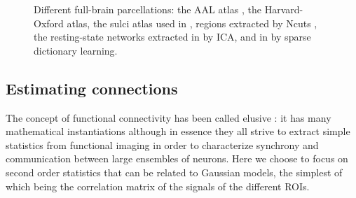 \documentclass[5p]{elsarticle}
\begin{document}
\begin{figure}
\caption{
Different full-brain parcellations: the AAL atlas
\cite{tzourio-mazoyer2002a}, the Harvard-Oxford atlas, the sulci atlas used in
\cite{varoquaux2010c}, regions extracted by Ncuts
\cite{craddock2012}, the resting-state networks extracted in
\cite{smith2009} by ICA, and in \cite{varoquaux2011} by sparse dictionary
learning.
\label{fig:parcellations}
}
\end{figure}

\subsection{Estimating connections}

The concept of functional connectivity has been called elusive
\cite{horwitz2003}: it has many mathematical instantiations although in
essence they all strive to extract simple statistics from functional
imaging in order to characterize synchrony and communication between large
ensembles of neurons. Here we choose to focus on second order statistics
that can be related to Gaussian models, the simplest of which being the
correlation matrix of the signals of the different ROIs.
\end{document}
